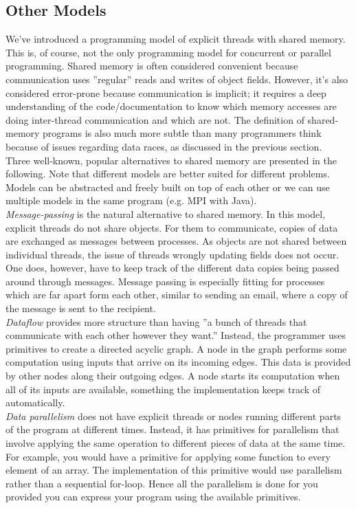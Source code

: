 \documentclass[main]{subfiles}
\begin{document}
\subsection{Other Models}
We've introduced a programming model of explicit threads with shared memory. This is, of course, not the only programming model for concurrent or parallel programming. Shared memory is often considered convenient because communication uses ''regular'' reads and writes of object fields. However, it's also considered error-prone because communication is implicit; it requires a deep understanding of the code/documentation to know which memory accesses are doing inter-thread communication and which are not. The definition of shared-memory programs is also much more subtle than many programmers think because of issues regarding data races, as discussed in the previous section.\\[3mm]
Three well-known, popular alternatives to shared memory are presented in the following. Note that different models are better suited for different problems. Models can be abstracted and freely built on top of each other or we can use multiple models in the same program (e.g. MPI with Java).\\[3mm]
\textit{Message-passing} is the natural alternative to shared memory. In this model, explicit threads do not share objects. For them to communicate, copies of data are exchanged as messages between processes. As objects are not shared between individual threads, the issue of threads wrongly updating fields does not occur. One does, however, have to keep track of the different data copies being passed around through messages. Message passing is especially fitting for processes which are far apart form each other, similar to sending an email, where a copy of the message is sent to the recipient.\\[3mm]
\textit{Dataflow} provides more structure than having ''a bunch of threads that communicate with each other however they want.'' Instead, the programmer uses primitives to create a directed acyclic graph. A node in the graph performs some computation using inputs that arrive on its incoming edges. This data is provided by other nodes along their outgoing edges. A node starts its computation when all of its inputs are available, something the implementation keeps track of automatically.\\[3mm]
\textit{Data parallelism} does not have explicit threads or nodes running different parts of the program at different times. Instead, it has primitives for parallelism that involve applying the same operation to different pieces of data at the same time. For example, you would have a primitive for applying some function to every element of an array. The implementation of this primitive would use parallelism rather than a sequential for-loop. Hence all the parallelism is done for you provided you can express your program using the available primitives.
\end{document}

